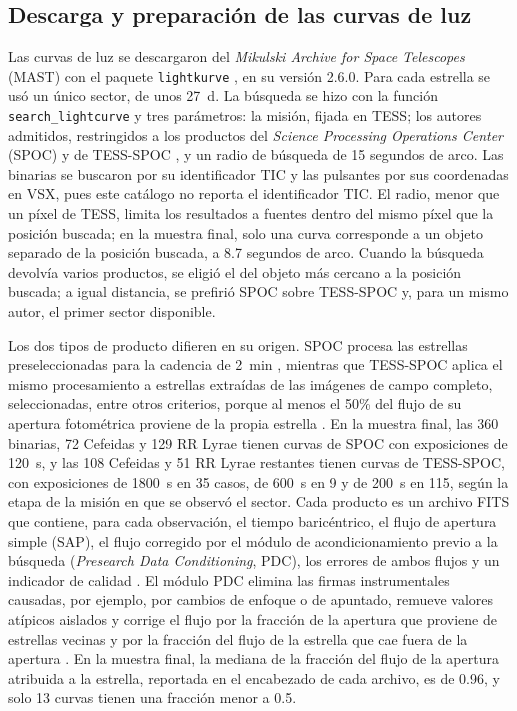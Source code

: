 \documentclass[12pt,letterpaper,oneside]{book}
\begin{document}
\subsection{Descarga y preparaci\'on de las curvas de luz}
\label{sec:validacion-descarga}

Las curvas de luz se descargaron del \emph{Mikulski Archive for Space Telescopes} (MAST) con el paquete \texttt{lightkurve} \citep{Lightkurve2018}, en su versi\'on 2.6.0. Para cada estrella se us\'o un \'unico sector, de unos 27~d. La b\'usqueda se hizo con la funci\'on \texttt{search\_lightcurve} y tres par\'ametros: la misi\'on, fijada en TESS; los autores admitidos, restringidos a los productos del \emph{Science Processing Operations Center} (SPOC) \citep{Jenkins2016} y de TESS-SPOC \citep{Caldwell2020}, y un radio de b\'usqueda de 15 segundos de arco. Las binarias se buscaron por su identificador TIC y las pulsantes por sus coordenadas en VSX, pues este cat\'alogo no reporta el identificador TIC. El radio, menor que un p\'ixel de TESS, limita los resultados a fuentes dentro del mismo p\'ixel que la posici\'on buscada; en la muestra final, solo una curva corresponde a un objeto separado de la posici\'on buscada, a 8.7 segundos de arco. Cuando la b\'usqueda devolv\'ia varios productos, se eligi\'o el del objeto m\'as cercano a la posici\'on buscada; a igual distancia, se prefiri\'o SPOC sobre TESS-SPOC y, para un mismo autor, el primer sector disponible.

Los dos tipos de producto difieren en su origen. SPOC procesa las estrellas preseleccionadas para la cadencia de 2~min \citep{Jenkins2016}, mientras que TESS-SPOC aplica el mismo procesamiento a estrellas extra\'idas de las im\'agenes de campo completo, seleccionadas, entre otros criterios, porque al menos el 50\% del flujo de su apertura fotom\'etrica proviene de la propia estrella \citep{Caldwell2020}. En la muestra final, las 360 binarias, 72 Cefeidas y 129 RR Lyrae tienen curvas de SPOC con exposiciones de 120~s, y las 108 Cefeidas y 51 RR Lyrae restantes tienen curvas de TESS-SPOC, con exposiciones de 1800~s en 35 casos, de 600~s en 9 y de 200~s en 115, seg\'un la etapa de la misi\'on en que se observ\'o el sector. Cada producto es un archivo FITS que contiene, para cada observaci\'on, el tiempo baric\'entrico, el flujo de apertura simple (SAP), el flujo corregido por el m\'odulo de acondicionamiento previo a la b\'usqueda (\emph{Presearch Data Conditioning}, PDC), los errores de ambos flujos y un indicador de calidad \citep{Caldwell2020}. El m\'odulo PDC elimina las firmas instrumentales causadas, por ejemplo, por cambios de enfoque o de apuntado, remueve valores at\'ipicos aislados y corrige el flujo por la fracci\'on de la apertura que proviene de estrellas vecinas y por la fracci\'on del flujo de la estrella que cae fuera de la apertura \citep{Jenkins2016}. En la muestra final, la mediana de la fracci\'on del flujo de la apertura atribuida a la estrella, reportada en el encabezado de cada archivo, es de 0.96, y solo 13 curvas tienen una fracci\'on menor a 0.5.
\end{document}
